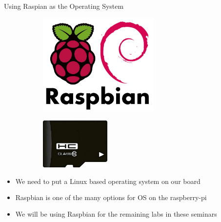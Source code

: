 \begin{frame}
   {Using Raspian as the Operating System}
   \begin{figure}[H]
      \centering
      \begin{subfigure}{0.4\textwidth}
         \centering
         \includegraphics[height=2in]{IMAGES/raspbian-logo}
      \end{subfigure}
      \begin{subfigure}{0.4\textwidth}
         \centering
         \includegraphics[height=1in]{IMAGES/uSD-card}
      \end{subfigure}
   \end{figure}
   \begin{itemize}
      \item We need to put a Linux based operating system on our board
      \item Raspbian is one of the many options for OS on the raspberry-pi
      \item We will be using Raspbian for the remaining labs in these seminars
   \end{itemize}
\end{frame}

\cprotect{}

